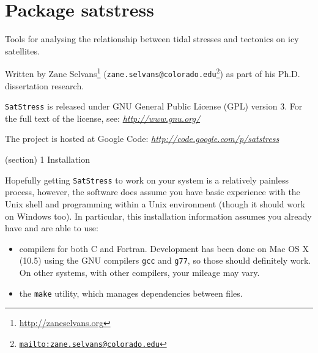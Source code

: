 %
%
%


\section{Package satstress}

    \label{satstress}
Tools for analysing the relationship between tidal stresses and tectonics 
on icy satellites.

Written by Zane 
Selvans\footnote{\href{http://zaneselvans.org}{http://zaneselvans.org}} 
(\texttt{zane.selvans@colorado.edu\footnote{\href{mailto:zane.selvans@colorado.edu}{mailto:zane.selvans@colorado.edu}}})
as part of his Ph.D. dissertation research.

\texttt{SatStress} is released under GNU General Public License (GPL) 
version 3.  For the full text of the license, see: 
\href{http://www.gnu.org/}{\textit{http://www.gnu.org/}}

The project is hosted at Google Code: 
\href{http://code.google.com/p/satstress}{\textit{http://code.google.com/p/satstress}}

(section) 1 Installation

  Hopefully getting \texttt{SatStress} to work on your system is a 
  relatively painless process, however, the software does assume you have 
  basic experience with the Unix shell and programming within a Unix 
  environment (though it should work on Windows too).  In particular, this 
  installation information assumes you already have and are able to use:

  \begin{itemize}
  \setlength{\parskip}{0.6ex}
    \item compilers for both C and Fortran.  Development has been done on Mac 
      OS X (10.5) using the GNU compilers \texttt{gcc} and \texttt{g77}, so
      those should definitely work.  On other systems, with other 
      compilers, your mileage may vary.

    \item the \texttt{make} utility, which manages dependencies between files.

  \end{itemize}

